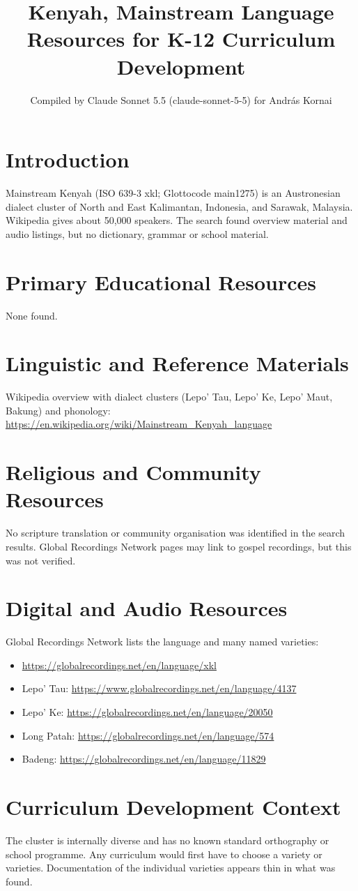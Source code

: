 \documentclass[12pt]{article}
\title{Kenyah, Mainstream Language Resources for K-12 Curriculum Development}
\author{Compiled by Claude Sonnet 5.5 (claude-sonnet-5-5) for Andr\'as Kornai}
\date{}
\begin{document}
\maketitle

\section{Introduction}
Mainstream Kenyah (ISO 639-3 xkl; Glottocode main1275) is an Austronesian dialect cluster of North and East Kalimantan, Indonesia, and Sarawak, Malaysia. Wikipedia gives about 50,000 speakers. The search found overview material and audio listings, but no dictionary, grammar or school material.

\section{Primary Educational Resources}
None found.

\section{Linguistic and Reference Materials}
Wikipedia overview with dialect clusters (Lepo' Tau, Lepo' Ke, Lepo' Maut, Bakung) and phonology: \url{https://en.wikipedia.org/wiki/Mainstream_Kenyah_language}

\section{Religious and Community Resources}
No scripture translation or community organisation was identified in the search results. Global Recordings Network pages may link to gospel recordings, but this was not verified.

\section{Digital and Audio Resources}
Global Recordings Network lists the language and many named varieties:
\begin{itemize}
\item \url{https://globalrecordings.net/en/language/xkl}
\item Lepo' Tau: \url{https://www.globalrecordings.net/en/language/4137}
\item Lepo' Ke: \url{https://globalrecordings.net/en/language/20050}
\item Long Patah: \url{https://globalrecordings.net/en/language/574}
\item Badeng: \url{https://globalrecordings.net/en/language/11829}
\end{itemize}

\section{Curriculum Development Context}
The cluster is internally diverse and has no known standard orthography or school programme. Any curriculum would first have to choose a variety or varieties. Documentation of the individual varieties appears thin in what was found.
\end{document}
